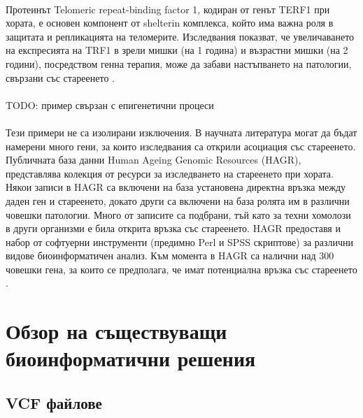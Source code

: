 \documentclass[pdftex,cyrillic,14pt,a4page,twoside]{extreport}
\begin{document}
\paragraph{}
Протеинът Telomeric repeat-binding factor 1, кодиран от генът TERF1 при хората, е основен компонент от shelterin комплекса, който има важна роля в защитата и репликацията на теломерите. Изследвания показват, че увеличаването на експресията на TRF1 в зрели мишки (на 1 година) и възрастни мишки (на 2 години), посредством генна терапия, може да забави настъпването на патологии, свързани със стареенето \cite{derevyanko2017}.

\paragraph{}
TODO: пример свързан с епигенетични процеси

\paragraph{}
Тези примери не са изолирани изключения. В научната литература могат да бъдат намерени много гени, за които изследвания са открили асоциация със стареенето. Публичната база данни Human Ageing Genomic Resources (HAGR), представлява колекция от ресурси за изследването на стареенето при хората. Някои записи в HAGR са включени на база установена директна връзка между даден ген и стареенето, докато други са включени на база ролята им в различни човешки патологии. Много от записите са подбрани, тъй като за техни хомолози в други организми е била открита връзка със стареенето. HAGR предоставя и набор от софтуерни инструменти (предимно Perl и SPSS скриптове) за различни видове биоинформатичен анализ. Към момента в HAGR са налични над 300 човешки гена, за които се предполага, че имат потенциална връзка със стареенето \cite{tacutu2018}.
 
\section[Обзор на съществуващи биоинформатични решения]{Обзор на съществуващи\\ биоинформатични решения}
\subsection{VCF файлове}
\end{document}
